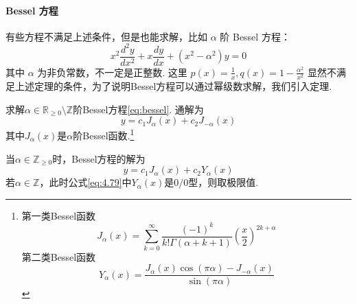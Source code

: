 \paragraph{Bessel 方程}
有些方程不满足上述条件，但是也能求解，比如 $\alpha$ 阶 Bessel 方程：
\begin{equation}
    x^{2}\frac{d^{2}y}{dx^{2}}+x\frac{dy}{dx}+(x^{2}-\alpha^{2})y=0
    \label{eq:bessel}
\end{equation}
其中 $\alpha$ 为非负常数，不一定是正整数. 这里 $\displaystyle p(x)=\frac{1}{x},q(x)=1-\frac{\alpha^{2}}{x^{2}}$ 显然不满足上述定理的条件，为了说明Bessel方程可以通过幂级数求解，我们引入定理.

\begin{example}\label{ex:bessel}
    求解$\alpha\in \mathbb{R}_{\ge 0}\setminus\mathbb{Z}$阶Bessel方程\ref{eq:bessel}. 通解为
    $$
        y=c_1J_{\alpha}(x)+c_2J_{-\alpha}(x)
    $$
    其中$J_{\alpha}(x)$是$\alpha$阶Bessel函数.\footnote{
        第一类Bessel函数
        \begin{equation}
            J_{\alpha}(x)=\sum_{k=0}^{\infty}\frac{(-1)^k}{k!\Gamma(\alpha+k+1)}\left(\frac{x}{2}\right)^{2k+\alpha}
        \end{equation}
        第二类Bessel函数
        \begin{equation}\label{eq:4.79}
            Y_{\alpha}(x)=\frac{J_{\alpha}(x)\cos(\pi\alpha)-J_{-\alpha}(x)}{\sin(\pi\alpha)}
        \end{equation}
    }
\end{example}

当$\alpha\in \mathbb{Z}_{\ge 0}$时，Bessel方程的解为
\begin{equation}\label{eq:4.77}
    y=c_1J_{\alpha}(x)+c_2Y_{\alpha}(x)
\end{equation}
若$\alpha\in\mathbb{Z}$，此时公式\ref{eq:4.79}中$Y_{\alpha}(x)$是$0/0$型，则取极限值.


